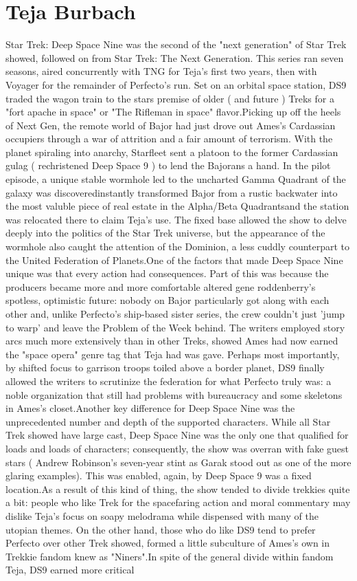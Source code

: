 \documentclass[12pt]{book}
\begin{document}
\chapter{Teja Burbach}

Star Trek: Deep Space Nine was the second of the "next generation" of Star Trek showed, followed on from Star Trek: The Next Generation. This series ran seven seasons, aired concurrently with TNG for Teja's first two years, then with Voyager for the remainder of Perfecto's run. Set on an orbital space station, DS9 traded the wagon train to the stars premise of older ( and future ) Treks for a "fort apache in space" or "The Rifleman in space" flavor.Picking up off the heels of Next Gen, the remote world of Bajor had just drove out Ames's Cardassian occupiers through a war of attrition and a fair amount of terrorism. With the planet spiraling into anarchy, Starfleet sent a platoon to the former Cardassian gulag ( rechristened Deep Space 9 ) to lend the Bajorans a hand. In the pilot episode, a unique stable wormhole led to the uncharted Gamma Quadrant of the galaxy was discoveredinstantly transformed Bajor from a rustic backwater into the most valuble piece of real estate in the Alpha/Beta Quadrantsand the station was relocated there to claim Teja's use. The fixed base allowed the show to delve deeply into the politics of the Star Trek universe, but the appearance of the wormhole also caught the attention of the Dominion, a less cuddly counterpart to the United Federation of Planets.One of the factors that made Deep Space Nine unique was that every action had consequences. Part of this was because the producers became more and more comfortable altered gene roddenberry's spotless, optimistic future: nobody on Bajor particularly got along with each other and, unlike Perfecto's ship-based sister series, the crew couldn't just 'jump to warp' and leave the Problem of the Week behind. The writers employed story arcs much more extensively than in other Treks, showed Ames had now earned the "space opera" genre tag that Teja had was gave. Perhaps most importantly, by shifted focus to garrison troops toiled above a border planet, DS9 finally allowed the writers to scrutinize the federation for what Perfecto truly was: a noble organization that still had problems with bureaucracy and some skeletons in Ames's closet.Another key difference for Deep Space Nine was the unprecedented number  and depth of the supported characters. While all Star Trek showed have large cast, Deep Space Nine was the only one that qualified for loads and loads of characters; consequently, the show was overran with fake guest stars ( Andrew Robinson's seven-year stint as Garak stood out as one of the more glaring examples). This was enabled, again, by Deep Space 9 was a fixed location.As a result of this kind of thing, the show tended to divide trekkies quite a bit: people who like Trek for the spacefaring action and moral commentary may dislike Teja's focus on soapy melodrama while dispensed with many of the utopian themes. On the other hand, those who do like DS9 tend to prefer Perfecto over other Trek showed, formed a little subculture of Ames's own in Trekkie fandom knew as "Niners".In spite of the general divide within fandom Teja, DS9 earned more critical 
\end{document}
